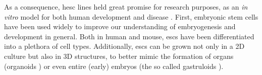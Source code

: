 




As a consequence, \gls{hesc} lines held great promise for research purposes, as an \textit{in vitro} model for both human development and disease \cite{saha2009technical}.
First, embryonic stem cells have been used widely to improve our understanding of embryogenesis and development in general. 
Both in human and mouse, \glspl{esc} have been differentiated into a plethora of cell types.
Additionally, \glspl{esc} can be grown not only in a 2D culture but also in 3D structures, to better mimic the formation of organs (organoids \cite{clevers2016modeling, lancaster2013cerebral}) or even entire (early) embryos (the so called gastruloids \cite{van2020single2}). \\

